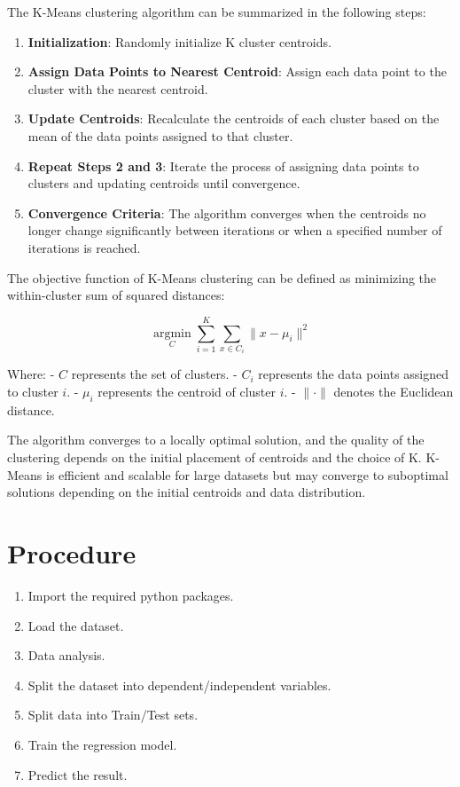\documentclass[11pt]{article}
\begin{document}
The K-Means clustering algorithm can be summarized in the following steps:

\begin{enumerate}
    \item \textbf{Initialization}: Randomly initialize K cluster centroids.
    \item \textbf{Assign Data Points to Nearest Centroid}: Assign each data point to the cluster with the nearest centroid.
    \item \textbf{Update Centroids}: Recalculate the centroids of each cluster based on the mean of the data points assigned to that cluster.
    \item \textbf{Repeat Steps 2 and 3}: Iterate the process of assigning data points to clusters and updating centroids until convergence.
    \item \textbf{Convergence Criteria}: The algorithm converges when the centroids no longer change significantly between iterations or when a specified number of iterations is reached.
\end{enumerate}

The objective function of K-Means clustering can be defined as minimizing the within-cluster sum of squared distances:

\[
    \underset{C}{\operatorname{argmin}} \sum_{i=1}^{K} \sum_{x \in C_{i}}\|x - \mu_{i}\|^2
\]

Where:
- \(C\) represents the set of clusters.
- \(C_{i}\) represents the data points assigned to cluster \(i\).
- \(\mu_{i}\) represents the centroid of cluster \(i\).
- \(\|\cdot\|\) denotes the Euclidean distance.

The algorithm converges to a locally optimal solution, and the quality of the clustering depends on the initial placement of centroids and the choice of K. K-Means is efficient and scalable for large datasets but may converge to suboptimal solutions depending on the initial centroids and data distribution.

\section{Procedure}
\begin{enumerate}
    \item Import the required python packages.
    \item Load the dataset.
    \item Data analysis.
    \item Split the dataset into dependent/independent variables.
    \item Split data into Train/Test sets.
    \item Train the regression model.
    \item Predict the result.
\end{enumerate}
\end{document}
